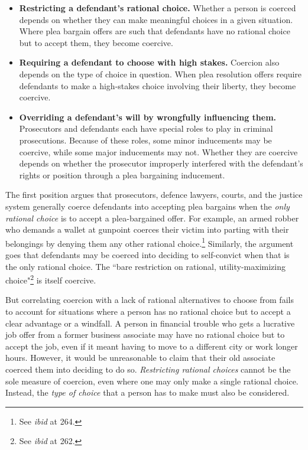 \begin{itemize}
    \item \textbf{Restricting a defendant's rational choice.} Whether a person is coerced depends on whether they can make meaningful choices in a given situation. Where plea bargain offers are such that defendants have no rational choice but to accept them, they become coercive.
    \item \textbf{Requiring a defendant to choose with high stakes.} Coercion also depends on the type of choice in question. When plea resolution offers require defendants to make a high-stakes choice involving their liberty, they become coercive.
    \item \textbf{Overriding a defendant's will by wrongfully influencing them.} Prosecutors and defendants each have special roles to play in criminal prosecutions. Because of these roles, some minor inducements may be coercive, while some major inducements may not. Whether they are coercive depends on whether the prosecutor improperly interfered with the defendant's rights or position through a plea bargaining inducement.
\end{itemize}
The first position argues that prosecutors, defence lawyers, courts, and the justice system generally coerce defendants into accepting plea bargains when the \textit{only rational choice} is to accept a plea-bargained offer. For example, an armed robber who demands a wallet at gunpoint coerces their victim into parting with their belongings by denying them any other rational choice.\footnote{See \textit{ibid} at 264.} Similarly, the argument goes that defendants may be coerced into deciding to self-convict when that is the only rational choice. The ``bare restriction on rational, utility-maximizing choice"\footnote{See \textit{ibid} at 262.} is itself coercive. 

But correlating coercion with a lack of rational alternatives to choose from fails to account for situations where a person has no rational choice but to accept a clear advantage or a windfall. A person in financial trouble who gets a lucrative job offer from a former business associate may have no rational choice but to accept the job, even if it meant having to move to a different city or work longer hours. However, it would be unreasonable to claim that their old associate coerced them into deciding to do so. \textit{Restricting rational choices} cannot be the sole measure of coercion, even where one may only make a single rational choice. Instead, the \textit{type of choice} that a person has to make must also be considered.


